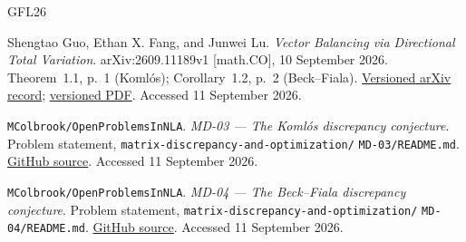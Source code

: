 \documentclass[11pt,a4paper]{article}
\begin{document}
\begin{thebibliography}{GFL26}

Shengtao Guo, Ethan X. Fang, and Junwei Lu.
\newblock \emph{Vector Balancing via Directional Total Variation}.
\newblock arXiv:2609.11189v1 [math.CO], 10 September 2026.
\newblock Theorem~1.1, p.~1 (Koml\'os); Corollary~1.2, p.~2
(Beck--Fiala).
\newblock \href{https://arxiv.org/abs/2609.11189v1}{Versioned arXiv record};
\href{https://arxiv.org/pdf/2609.11189v1}{versioned PDF}.
\newblock Accessed 11 September 2026.

\texttt{MColbrook/OpenProblemsInNLA}.
\newblock \emph{MD-03 --- The Koml\'os discrepancy conjecture}.
\newblock Problem statement, \texttt{matrix-discrepancy-and-optimization/}
\texttt{MD-03/README.md}.
\newblock \href{https://github.com/MColbrook/OpenProblemsInNLA/blob/main/matrix-discrepancy-and-optimization/MD-03/README.md}{GitHub source}.
\newblock Accessed 11 September 2026.

\texttt{MColbrook/OpenProblemsInNLA}.
\newblock \emph{MD-04 --- The Beck--Fiala discrepancy conjecture}.
\newblock Problem statement, \texttt{matrix-discrepancy-and-optimization/}
\texttt{MD-04/README.md}.
\newblock \href{https://github.com/MColbrook/OpenProblemsInNLA/blob/main/matrix-discrepancy-and-optimization/MD-04/README.md}{GitHub source}.
\newblock Accessed 11 September 2026.

\end{thebibliography}
\end{document}
